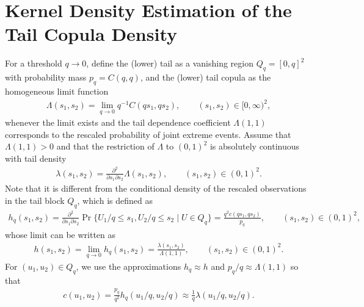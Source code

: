 \documentclass[12pt, headinclude=true]{scrartcl}
\begin{document}
\section{Kernel Density Estimation of the Tail Copula Density}
For a threshold $q\to0$, define the (lower) tail as a vanishing region $Q_q=[0, q]^2$ with probability mass $p_q=C(q,q)$, and
the (lower) tail copula \citep{schmidt2006non} as the homogeneous limit function
\begin{align*}%
  \Lambda(s_1,s_2)
  =
  \lim_{q\rightarrow0}
  q^{-1}C(qs_1,qs_2),
  \qquad (s_1,s_2)\in[0,\infty)^2,
\end{align*}
whenever the limit exists and the tail dependence coefficient $\Lambda(1,1)$ corresponds to the rescaled probability of joint extreme events.
Assume that $\Lambda(1,1)>0$ and that the restriction of $\Lambda$ to $(0,1)^2$ is absolutely
continuous with tail density
\begin{align*}
  \lambda(s_1,s_2)
  =
  \frac{\partial^2}{\partial s_1\partial s_2}\Lambda(s_1,s_2),
  \qquad (s_1,s_2)\in(0,1)^2.
\end{align*}
Note that it is different from the conditional density of the rescaled observations in the tail block $Q_q$, which is defined as
\begin{align*}
  h_q(s_1,s_2)
  =
   \frac{\partial^2}{\partial s_1\partial s_2} \Pr\{U_1/q \leq s_1, U_2/q \leq s_2 \mid U \in Q_q\} = \frac{q^2 c(qs_1,qs_2)}{p_q},
  \qquad (s_1,s_2)\in(0,1)^2,
\end{align*}
whose limit can be written as
\begin{align*}
  h(s_1,s_2)
  =
  \lim_{q\to0}h_q(s_1,s_2)
  =
  \frac{\lambda(s_1,s_2)}{\Lambda(1,1)},
  \qquad (s_1,s_2)\in(0,1)^2.
\end{align*}
For $(u_1,u_2)\in Q_q$, we use the approximations $h_q \approx h$ and $p_q / q \approx \Lambda(1,1)$ so that
\begin{align*}
  c(u_1,u_2) = \frac{p_q}{q^2} h_q(u_1/q,u_2/q) \approx \frac{1}{q}\lambda(u_1/q,u_2/q).
\end{align*}
\end{document}
